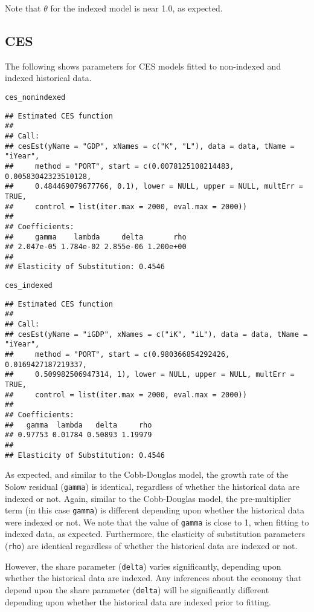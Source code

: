 \documentclass{article}\usepackage[]{graphicx}\usepackage[]{color}
\makeatletter
\newcommand{\hlstd}[1]{\textcolor[rgb]{0.345,0.345,0.345}{#1}}%
\newenvironment{kframe}{%
 \def\at@end@of@kframe{}%
 \ifinner\ifhmode%
  \def\at@end@of@kframe{\end{minipage}}%
  \begin{minipage}{\columnwidth}%
 \fi\fi%
 \def\FrameCommand##1{\hskip\@totalleftmargin \hskip-\fboxsep
 \colorbox{shadecolor}{##1}\hskip-\fboxsep
     \hskip-\linewidth \hskip-\@totalleftmargin \hskip\columnwidth}%
 \MakeFramed {\advance\hsize-\width
   \@totalleftmargin\z@ \linewidth\hsize
   \@setminipage}}%
 {\par\unskip\endMakeFramed%
 \at@end@of@kframe}
\newenvironment{knitrout}{}{} %
\makeatother
\begin{document}
Note that $\theta$ for the indexed model is near 1.0, as expected.


\subsection{CES}
\label{sec:ces_coeffs}

The following shows parameters for CES models
fitted to non-indexed and indexed historical data.

\begin{knitrout}
\color{fgcolor}\begin{kframe}
\begin{alltt}
\hlstd{ces_nonindexed}
\end{alltt}
\begin{verbatim}
## Estimated CES function
## 
## Call:
## cesEst(yName = "GDP", xNames = c("K", "L"), data = data, tName = "iYear", 
##     method = "PORT", start = c(0.0078125108214483, 0.00583042323510128, 
##     0.484469079677766, 0.1), lower = NULL, upper = NULL, multErr = TRUE, 
##     control = list(iter.max = 2000, eval.max = 2000))
## 
## Coefficients:
##     gamma    lambda     delta       rho 
## 2.047e-05 1.784e-02 2.855e-06 1.200e+00 
## 
## Elasticity of Substitution: 0.4546
\end{verbatim}
\begin{alltt}
\hlstd{ces_indexed}
\end{alltt}
\begin{verbatim}
## Estimated CES function
## 
## Call:
## cesEst(yName = "iGDP", xNames = c("iK", "iL"), data = data, tName = "iYear", 
##     method = "PORT", start = c(0.980366854292426, 0.0169427187219337, 
##     0.509982506947314, 1), lower = NULL, upper = NULL, multErr = TRUE, 
##     control = list(iter.max = 2000, eval.max = 2000))
## 
## Coefficients:
##   gamma  lambda   delta     rho 
## 0.97753 0.01784 0.50893 1.19979 
## 
## Elasticity of Substitution: 0.4546
\end{verbatim}
\end{kframe}
\end{knitrout}

As expected, and similar to the Cobb-Douglas model,
the growth rate of the Solow residual
(\verb+gamma+)
is identical, regardless of whether the historical data are indexed or not.
Again, similar to the Cobb-Douglas model, 
the pre-multiplier term
(in this case \verb+gamma+)
is different depending upon whether the historical data were indexed or not.
We note that the value of \verb+gamma+ is close to 1,
when fitting to indexed data,
as expected.
Furthermore, the elasticity of substitution parameters
(\verb+rho+)
are identical regardless of whether the historical data are indexed or not.

However, the share parameter
(\verb+delta+)
varies significantly, depending upon whether 
the historical data are indexed.
Any inferences about the economy that depend upon the share parameter (\verb+delta+)
will be significantly different depending upon whether the 
historical data are indexed prior to fitting.
\end{document}
